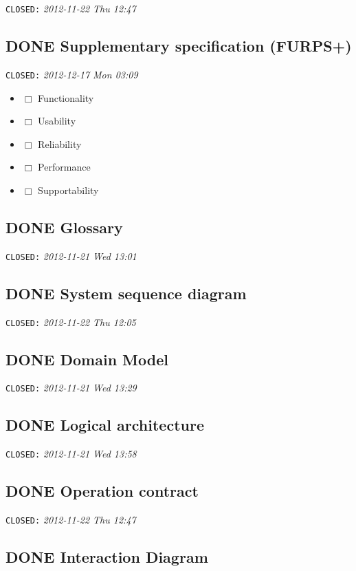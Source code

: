 \documentclass[11pt,a4paper]{article}
\begin{document}
    \texttt{CLOSED:} \textit{2012-11-22 Thu 12:47}
\subsection{\textbf{DONE} Supplementary specification (FURPS+)}
\label{sec-1-3}

   \texttt{CLOSED:} \textit{2012-12-17 Mon 03:09}

\begin{itemize}
\item $\Box$ Functionality
\item $\Box$ Usability
\item $\Box$ Reliability
\item $\Box$ Performance
\item $\Box$ Supportability
\end{itemize}
\subsection{\textbf{DONE} Glossary}
\label{sec-1-4}

   \texttt{CLOSED:} \textit{2012-11-21 Wed 13:01}
\subsection{\textbf{DONE} System sequence diagram}
\label{sec-1-5}

   \texttt{CLOSED:} \textit{2012-11-22 Thu 12:05}
\subsection{\textbf{DONE} Domain Model}
\label{sec-1-6}

   \texttt{CLOSED:} \textit{2012-11-21 Wed 13:29}
\subsection{\textbf{DONE} Logical architecture}
\label{sec-1-7}

   \texttt{CLOSED:} \textit{2012-11-21 Wed 13:58}
\subsection{\textbf{DONE} Operation contract}
\label{sec-1-8}

   \texttt{CLOSED:} \textit{2012-11-22 Thu 12:47}
\subsection{\textbf{DONE} Interaction Diagram}
\label{sec-1-9}
\end{document}

